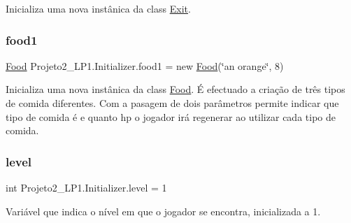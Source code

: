 Inicializa uma nova instânica da class \mbox{\hyperlink{class_projeto2___l_p1_1_1_exit}{Exit}}. 

\mbox{\label{class_projeto2___l_p1_1_1_initializer_a16290d59b95ab29b69212538a9cb2300}} 
\subsubsection{\texorpdfstring{food1}{food1}}
{\footnotesize\ttfamily \mbox{\hyperlink{class_projeto2___l_p1_1_1_food}{Food}} Projeto2\+\_\+\+L\+P1.\+Initializer.\+food1 = new \mbox{\hyperlink{class_projeto2___l_p1_1_1_food}{Food}}(\char`\"{}an orange\char`\"{}, 8)}



Inicializa uma nova instânica da class \mbox{\hyperlink{class_projeto2___l_p1_1_1_food}{Food}}. É efectuado a criação de três tipos de comida diferentes. Com a pasagem de dois parâmetros permite indicar que tipo de comida é e quanto hp o jogador irá regenerar ao utilizar cada tipo de comida. 

\mbox{\label{class_projeto2___l_p1_1_1_initializer_a4797e0983bdfd34077033ad34a865208}} 
\subsubsection{\texorpdfstring{level}{level}}
{\footnotesize\ttfamily int Projeto2\+\_\+\+L\+P1.\+Initializer.\+level = 1}



Variável que indica o nível em que o jogador se encontra, inicializada a 1. 

\mbox{\label{class_projeto2___l_p1_1_1_initializer_a15256baa4576459e5d15eb305e46cb1c}} 
